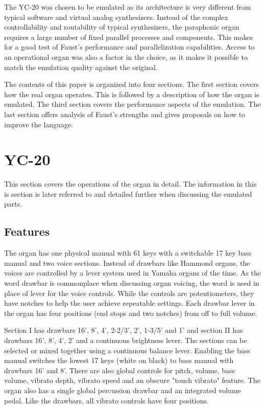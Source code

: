 \documentclass[11pt,a4paper]{article}
\begin{document}
The YC-20 was chosen to be emulated as its architecture is very different from typical software and virtual analog synthesizers. Instead of the complex controllability and routability of typical synthesizers, the paraphonic organ requires a large number of fixed parallel processes and components. This makes for a good test of Faust's performance and parallelization capabilities. Access to an operational organ was also a factor in the choice, as it makes it possible to match the emulation quality against the original. 

The contents of this paper is organized into four sections. The first section covers how the real organ operates. This is followed by a description of how the organ is emulated. The third section covers the performance aspects of the emulation. The last section offers analysis of Faust's strengths and gives proposals on how to improve the language.

\section{YC-20}
\label{section:yc-20}

This section covers the operations of the organ in detail\cite{yamaha:yc20}. The information in this is section is later referred to and detailed further when discussing the emulated parts.

\subsection{Features}

The organ has one physical manual with 61 keys with a switchable 17 key bass manual and two voice sections. Instead of drawbars like Hammond organs, the voices are controlled by a lever system used in Yamaha organs of the time. As the word drawbar is commonplace when discussing organ voicing, the word is used in place of lever for the voice controls. While the controls are potentiometers, they have notches to help the user achieve repeatable settings. Each drawbar lever in the organ has four positions (end stops and two notches) from off to full volume. 

Section I has drawbars 16', 8', 4', 2-2/3', 2', 1-3/5' and 1' and section II has drawbars 16', 8', 4', 2' and a continuous brightness lever. The sections can be selected or mixed together using a continuous balance lever. Enabling the bass manual switches the lowest 17 keys (white on black) to bass manual with drawbars 16' and 8'. There are also global controls for pitch, volume, bass volume, vibrato depth, vibrato speed and an obscure "touch vibrato" feature. The organ also has a single global percussion drawbar and an integrated volume pedal. Like the drawbars, all vibrato controls have four positions.
\end{document}
